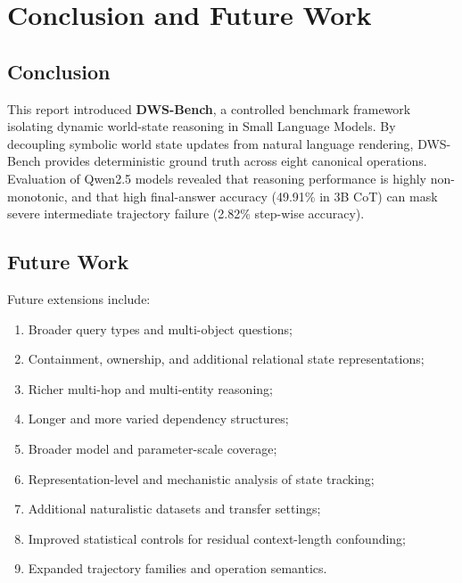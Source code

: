 \documentclass{iutbscthesis}
\begin{document}
\chapter{Conclusion and Future Work}

\section{Conclusion}
This report introduced \textbf{DWS-Bench}, a controlled benchmark framework isolating dynamic world-state reasoning in Small Language Models. By decoupling symbolic world state updates from natural language rendering, DWS-Bench provides deterministic ground truth across eight canonical operations. Evaluation of Qwen2.5 models revealed that reasoning performance is highly non-monotonic, and that high final-answer accuracy (49.91\% in 3B CoT) can mask severe intermediate trajectory failure (2.82\% step-wise accuracy).

\section{Future Work}
Future extensions include:
\begin{enumerate}[noitemsep]
    \item Broader query types and multi-object questions;
    \item Containment, ownership, and additional relational state representations;
    \item Richer multi-hop and multi-entity reasoning;
    \item Longer and more varied dependency structures;
    \item Broader model and parameter-scale coverage;
    \item Representation-level and mechanistic analysis of state tracking;
    \item Additional naturalistic datasets and transfer settings;
    \item Improved statistical controls for residual context-length confounding;
    \item Expanded trajectory families and operation semantics.
\end{enumerate}
\end{document}
